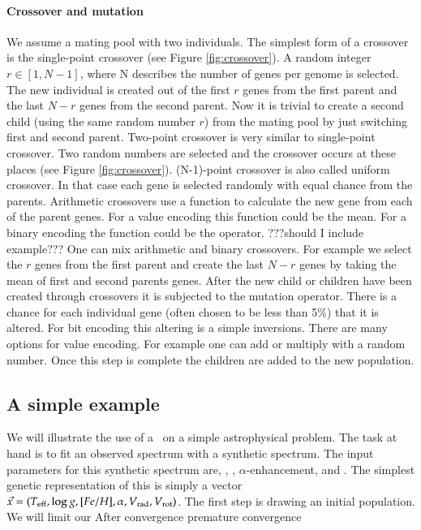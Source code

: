 \paragraph{Crossover and mutation}
We assume a mating pool with two individuals. The simplest form of a crossover is the single-point crossover (see Figure \ref{fig:crossover}). A random integer $r \in [1,N-1]$, where N describes the number of genes per genome is selected. The new individual is created out of the first $r$ genes from the first parent and the last $N-r$ genes from the second parent. Now it is trivial to create a second child (using the same random number $r$) from the mating pool by just switching first and second parent. 
Two-point crossover is very similar to single-point crossover. Two random numbers are selected and the crossover occurs at these places (see Figure \ref{fig:crossover}). (N-1)-point crossover is also called uniform crossover. In that case each gene is selected randomly with equal chance from the parents.
Arithmetic crossovers use a function to calculate the new gene from each of the parent genes. For a value encoding this function could be the mean. For a binary encoding the function could be the  operator. ???should I include example???
One can mix arithmetic and binary crossovers. For example we select the $r$ genes from the first parent and create the last $N-r$ genes by taking the mean of first and second parents genes. 
After the new child or children have been created through crossovers it is subjected to the mutation operator. There is a chance for each individual gene (often chosen to be less than 5\%) that it is altered. For bit encoding this altering is a simple inversions. There are many options for value encoding. For example one can add or multiply with a random number. 
Once this step is complete the children are added to the new population.

\subsection{A simple example}
We will illustrate the use of a \ga\ on a simple astrophysical problem. The task at hand is to fit an observed spectrum with a synthetic spectrum. The input parameters for this synthetic spectrum are\teff, \logg, \feh, $\alpha$-enhancement, \vrad and \vrot. The simplest genetic representation of this is simply a vector $\vec{x} = (T_{\rm eff}, \log{g}, [Fe/H], \alpha, \hbox{$V_{\textrm{rad}}$}, \hbox{$V_{\textrm{rot}}$})$. 
The first step is drawing an initial population. We will limit our 
After 
convergence 
premature convergence

